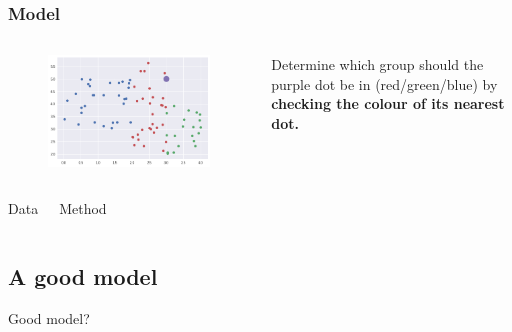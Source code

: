 \documentclass[]{beamer}
\begin{document}
\begin{frame}
\frametitle{Model}
\begin{columns}
\begin{figure}
\includegraphics[scale=.3]{imgs/simple_knn.png}
\end{figure}
Determine which group should the purple dot be in (red/green/blue) by \textbf{checking the colour of its nearest dot.}
\end{columns}
\begin{columns}
\begin{center}
\Large Data
\end{center}
\begin{center}
\Large Method
\end{center}
\end{columns}
\end{frame}

\subsection{A good model}
\begin{frame}
\begin{center}
{\Huge Good model?}\\
\end{center}
\end{frame}
\end{document}
